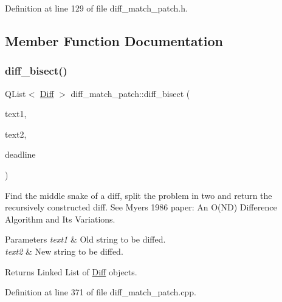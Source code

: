 Definition at line 129 of file diff\+\_\+match\+\_\+patch.\+h.



\subsection{Member Function Documentation}
\mbox{\label{classdiff__match__patch_a10f6b81afc589a091a74d00d58ec1a5a}} 
\subsubsection{\texorpdfstring{diff\+\_\+bisect()}{diff\_bisect()}}
{\footnotesize\ttfamily Q\+List$<$ \hyperlink{class_diff}{Diff} $>$ diff\+\_\+match\+\_\+patch\+::diff\+\_\+bisect (\begin{DoxyParamCaption}\item[{const Q\+String \&}]{text1,  }\item[{const Q\+String \&}]{text2,  }\item[{clock\+\_\+t}]{deadline }\end{DoxyParamCaption})\hspace{0.3cm}{\ttfamily [protected]}}

Find the \textquotesingle{}middle snake\textquotesingle{} of a diff, split the problem in two and return the recursively constructed diff. See Myers 1986 paper\+: An O(\+N\+D) Difference Algorithm and Its Variations. 
\begin{DoxyParams}{Parameters}
{\em text1} & Old string to be diffed. \\
\hline
{\em text2} & New string to be diffed. \\
\hline
\end{DoxyParams}
\begin{DoxyReturn}{Returns}
Linked List of \hyperlink{class_diff}{Diff} objects. 
\end{DoxyReturn}


Definition at line 371 of file diff\+\_\+match\+\_\+patch.\+cpp.

\mbox{\label{classdiff__match__patch_a41df9d26471d7d9f4ca085ab9f5da945}} 
